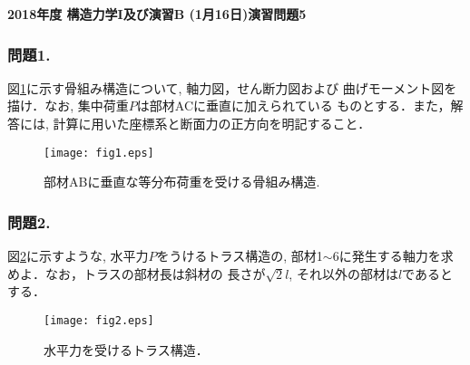 \documentclass[10pt,a4j]{jarticle}
\newlength{\minitwocolumn}
\begin{document}
\newcommand{\fat}[1]{\mbox{\boldmath $#1$}}
\newcommand{\D}{\partial}
\newcommand{\w}{\omega}
\newcommand{\ga}{\alpha}
\newcommand{\gb}{\beta}
\newcommand{\gx}{\xi}
\newcommand{\gz}{\zeta}
\newcommand{\vhat}[1]{\hat{\fat{#1}}}
\newcommand{\spc}{\vspace{0.7\baselineskip}}
\newcommand{\halfspc}{\vspace{0.3\baselineskip}}

\pagestyle{empty}
\newcommand{\twofig}[2]
 {
   \begin{figure}[h]
     \begin{minipage}[t]{\minitwocolumn}
         \begin{center}   #1
         \end{center}
     \end{minipage}
         \hspace{\columnsep}
     \begin{minipage}[t]{\minitwocolumn}
         \begin{center} #2
         \end{center}
     \end{minipage}
   \end{figure}
 }
\begin{center}
{\Large \bf 2018年度 構造力学I及び演習B (1月16日)演習問題5} \\
\end{center}
\subsubsection*{問題1.}
図\ref{fig:fig1}に示す骨組み構造について, 軸力図，せん断力図および
曲げモーメント図を描け．なお, 集中荷重$P$は部材ACに垂直に加えられている
ものとする．また，解答には, 計算に用いた座標系と断面力の正方向を明記すること．
\begin{figure}[h]
	\begin{center}
	\texttt{[image: fig1.eps]} 
	\end{center}
	\caption{部材ABに垂直な等分布荷重を受ける骨組み構造.}
	\label{fig:fig1}
\end{figure}
\subsubsection*{問題2.}
図\ref{fig:fig2}に示すような, 水平力$P$をうけるトラス構造の, 
部材1$\sim$6に発生する軸力を求めよ．なお，トラスの部材長は斜材の
長さが$\sqrt{2}l$, それ以外の部材は$l$であるとする．
\begin{figure}[h]
	\begin{center}
	\texttt{[image: fig2.eps]} 
	\end{center}
	\caption{水平力を受けるトラス構造．} 
	\label{fig:fig2}
\end{figure}
\end{document}
